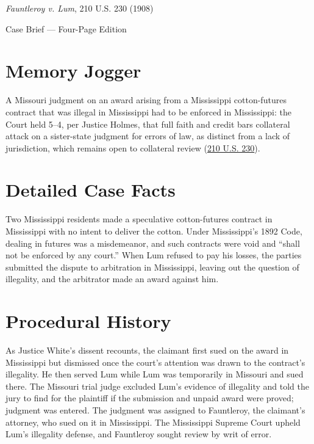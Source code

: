\documentclass[12pt]{article}
\begin{document}
\begin{center}
{\LARGE \textit{Fauntleroy v. Lum}, 210 U.S. 230 (1908)\par}
\vspace{0.8em}
{\large Case Brief --- Four-Page Edition\par}
\end{center}
\vspace{1em}

\section{Memory Jogger}

A Missouri judgment on an award arising from a Mississippi cotton-futures contract that was illegal in Mississippi had to be enforced in Mississippi: the Court held 5--4, per Justice Holmes, that full faith and credit bars collateral attack on a sister-state judgment for errors of law, as distinct from a lack of jurisdiction, which remains open to collateral review (\href{https://supreme.justia.com/cases/federal/us/210/230/}{210 U.S. 230}).

\section{Detailed Case Facts}

Two Mississippi residents made a speculative cotton-futures contract in Mississippi with no intent to deliver the cotton. Under Mississippi's 1892 Code, dealing in futures was a misdemeanor, and such contracts were void and ``shall not be enforced by any court.'' When Lum refused to pay his losses, the parties submitted the dispute to arbitration in Mississippi, leaving out the question of illegality, and the arbitrator made an award against him.

\section{Procedural History}

As Justice White's dissent recounts, the claimant first sued on the award in Mississippi but dismissed once the court's attention was drawn to the contract's illegality. He then served Lum while Lum was temporarily in Missouri and sued there. The Missouri trial judge excluded Lum's evidence of illegality and told the jury to find for the plaintiff if the submission and unpaid award were proved; judgment was entered. The judgment was assigned to Fauntleroy, the claimant's attorney, who sued on it in Mississippi. The Mississippi Supreme Court upheld Lum's illegality defense, and Fauntleroy sought review by writ of error.
\end{document}
